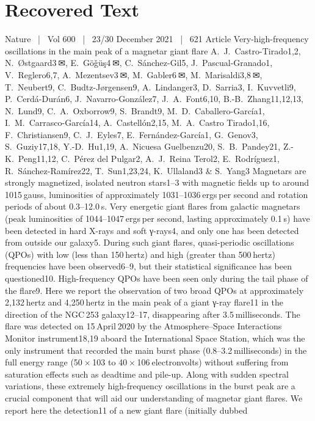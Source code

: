 \section{Recovered Text}
Nature  |  Vol 600  |  23/30 December 2021  |  621
Article
Very-high-frequency oscillations in the main
peak of a magnetar giant flare
A. J. Castro-Tirado1,2, N. Østgaard3 ✉, E. Göǧüş4 ✉, C. Sánchez-Gil5, J. Pascual-Granado1,
V. Reglero6,7, A. Mezentsev3 ✉, M. Gabler6 ✉, M. Marisaldi3,8 ✉, T. Neubert9,
C. Budtz-Jørgensen9, A. Lindanger3, D. Sarria3, I. Kuvvetli9, P. Cerdá-Durán6,
J. Navarro-González7, J. A. Font6,10, B.-B. Zhang11,12,13, N. Lund9, C. A. Oxborrow9, S. Brandt9,
M. D. Caballero-García1, I. M. Carrasco-García14, A. Castellón2,15, M. A. Castro Tirado1,16,
F. Christiansen9, C. J. Eyles7, E. Fernández-García1, G. Genov3, S. Guziy17,18, Y.-D. Hu1,19,
A. Nicuesa Guelbenzu20, S. B. Pandey21, Z.-K. Peng11,12, C. Pérez del Pulgar2, A. J. Reina Terol2,
E. Rodríguez1, R. Sánchez-Ramírez22, T. Sun1,23,24, K. Ullaland3 \& S. Yang3
Magnetars are strongly magnetized, isolated neutron stars1–3 with magnetic fields
up to around 1015 gauss, luminosities of approximately 1031–1036 ergs per second
and rotation periods of about 0.3–12.0 s. Very energetic giant flares from galactic
magnetars (peak luminosities of 1044–1047 ergs per second, lasting approximately 0.1 s)
have been detected in hard X-rays and soft γ-rays4, and only one has been detected
from outside our galaxy5. During such giant flares, quasi-periodic oscillations (QPOs)
with low (less than 150 hertz) and high (greater than 500 hertz) frequencies have been
observed6–9, but their statistical significance has been questioned10. High-frequency
QPOs have been seen only during the tail phase of the flare9. Here we report the
observation of two broad QPOs at approximately 2,132 hertz and 4,250 hertz in
the main peak of a giant γ-ray flare11 in the direction of the NGC 253 galaxy12–17,
disappearing after 3.5 milliseconds. The flare was detected on 15 April 2020 by the
Atmosphere–Space Interactions Monitor instrument18,19 aboard the International
Space Station, which was the only instrument that recorded the main burst phase
(0.8–3.2 milliseconds) in the full energy range (50 × 103 to 40 × 106 electronvolts)
without suffering from saturation effects such as deadtime and pile-up. Along with
sudden spectral variations, these extremely high-frequency oscillations in the burst
peak are a crucial component that will aid our understanding of magnetar giant flares.
We report here the detection11 of a new giant flare (initially dubbed
